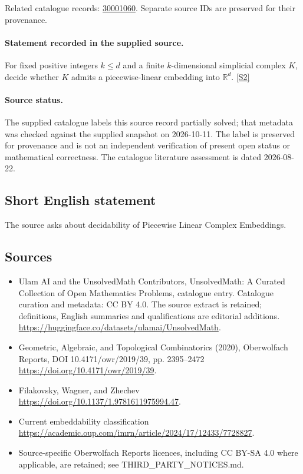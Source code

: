 \documentclass[11pt]{article}
\begin{document}
Related catalogue records: \href{https://mehmetmars7.github.io/Erdosproblems-llm-hunter/problem.html?type=open_problems&id=30001060}{30001060}. Separate source IDs are preserved for their provenance.
\paragraph{Statement recorded in the supplied source.}
For fixed positive integers $k\leq d$ and a finite $k$-dimensional simplicial complex $K$, decide whether $K$ admits a piecewise-linear embedding into $\mathbb R^d$. \href{https://doi.org/10.4171/owr/2019/39}{[S2]}
\paragraph{Source status.}
The supplied catalogue labels this source record partially solved; that metadata was checked against the supplied snapshot on 2026-10-11. The label is preserved for provenance and is not an independent verification of present open status or mathematical correctness. The catalogue literature assessment is dated 2026-08-22.
\subsection{Short English statement}
The source asks about decidability of Piecewise Linear Complex Embeddings.
\subsection{Sources}
\begin{itemize}
\item[S1] Ulam AI and the UnsolvedMath Contributors, UnsolvedMath: A Curated Collection of Open Mathematics Problems, catalogue entry. Catalogue curation and metadata: CC BY 4.0. The source extract is retained; definitions, English summaries and qualifications are editorial additions.
\url{https://huggingface.co/datasets/ulamai/UnsolvedMath}.
\item[S2] Geometric, Algebraic, and Topological Combinatorics (2020), Oberwolfach Reports, DOI 10.4171/owr/2019/39, pp. 2395--2472
\url{https://doi.org/10.4171/owr/2019/39}.
\item[S3] Filakovsky, Wagner, and Zhechev
\url{https://doi.org/10.1137/1.9781611975994.47}.
\item[S4] Current embeddability classification
\url{https://academic.oup.com/imrn/article/2024/17/12433/7728827}.
\item Source-specific Oberwolfach Reports licences, including CC BY-SA 4.0 where applicable, are retained; see THIRD\_PARTY\_NOTICES.md.
\end{itemize}
\end{document}
